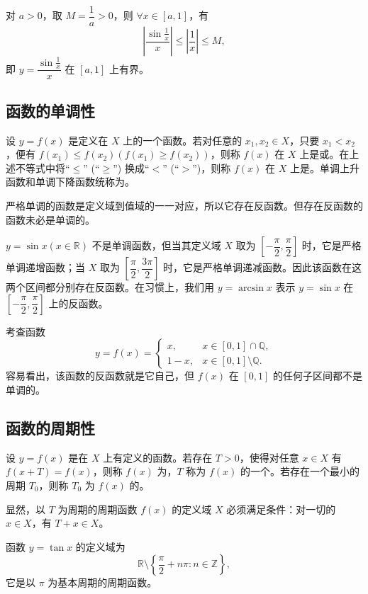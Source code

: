 \documentclass[UTF8,12pt,a4paper,fontset=fandol]{ctexbook}
\begin{document}
对 $a>0$，取 $M=\dfrac1a>0$，则 $\forall x\in[a,1]$，有
\[
  \left|\frac{\sin\frac1x}{x}\right|\le \left|\frac1x\right|\le M,
\]
即 $y=\dfrac{\sin\frac1x}{x}$ 在 $[a,1]$ 上有界。

\subsection{函数的单调性}

设 $y=f(x)$ 是定义在 $X$ 上的一个函数。若对任意的 $x_1,x_2\in X$，只要 $x_1<x_2$，便有 $f(x_1)\le f(x_2)(f(x_1)\ge f(x_2))$，则称 $f(x)$ 在 $X$ 上是或。在上述不等式中将``$\le$'' (``$\ge$'') 换成``$<$'' (``$>$'')，则称 $f(x)$ 在 $X$ 上是。单调上升函数和单调下降函数统称为。

严格单调的函数是定义域到值域的一一对应，所以它存在反函数。但存在反函数的函数未必是单调的。

\noindent{}\quad $y=\sin x(x\in\mathbb{R})$ 不是单调函数，但当其定义域 $X$ 取为 $\left[-\dfrac\pi2,\dfrac\pi2\right]$ 时，它是严格单调递增函数；当 $X$ 取为 $\left[\dfrac\pi2,\dfrac{3\pi}2\right]$ 时，它是严格单调递减函数。因此该函数在这两个区间都分别存在反函数。在习惯上，我们用 $y=\arcsin x$ 表示 $y=\sin x$ 在 $\left[-\dfrac\pi2,\dfrac\pi2\right]$ 上的反函数。

\noindent{}\quad 考查函数
\[
  y=f(x)=
  \begin{cases}
    x, & x\in[0,1]\cap\mathbb{Q},\\
    1-x, & x\in[0,1]\setminus\mathbb{Q}.
  \end{cases}
\]
容易看出，该函数的反函数就是它自己，但 $f(x)$ 在 $[0,1]$ 的任何子区间都不是单调的。

\subsection{函数的周期性}

设 $y=f(x)$ 是在 $X$ 上有定义的函数。若存在 $T>0$，使得对任意 $x\in X$ 有 $f(x+T)=f(x)$，则称 $f(x)$ 为，$T$ 称为 $f(x)$ 的一个。若存在一个最小的周期 $T_0$，则称 $T_0$ 为 $f(x)$ 的。

显然，以 $T$ 为周期的周期函数 $f(x)$ 的定义域 $X$ 必须满足条件：对一切的 $x\in X$，有 $T+x\in X$。

\noindent{}\quad 函数 $y=\tan x$ 的定义域为
\[
  \mathbb{R}\setminus\left\{\frac\pi2+n\pi:n\in\mathbb{Z}\right\},
\]
它是以 $\pi$ 为基本周期的周期函数。
\end{document}
